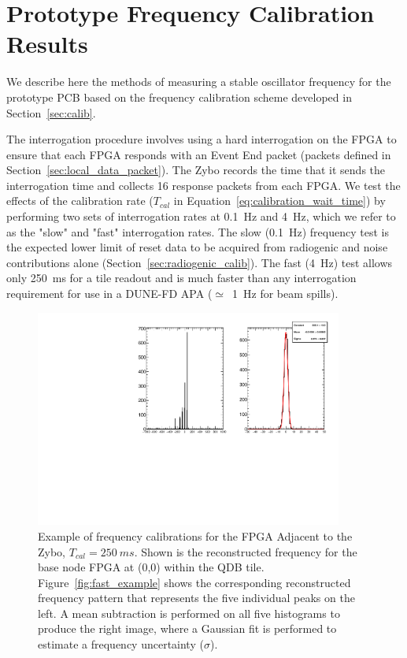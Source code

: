 \section{Prototype Frequency Calibration Results}
\label{sec:freq_calib_results}
We describe here the methods of measuring a stable oscillator frequency for the prototype PCB based on the frequency calibration scheme developed in Section~\ref{sec:calib}.

The interrogation procedure involves using a hard interrogation on the FPGA to ensure that each FPGA responds with an Event End packet (packets defined in Section~\ref{sec:local_data_packet}).
The Zybo records the time that it sends the interrogation time and collects 16 response packets from each FPGA.
We test the effects of the calibration rate ($T_{cal}$ in Equation~\ref{eq:calibration_wait_time}) by performing two sets of interrogation rates at 0.1~\unit{Hz} and 4~\unit{Hz}, which we refer to as the "slow" and "fast" interrogation rates.
The slow (0.1~\unit{Hz}) frequency test is the expected lower limit of reset data to be acquired from radiogenic and noise contributions alone (Section~\ref{sec:radiogenic_calib}).
The fast (4~\unit{Hz}) test allows only 250~\unit{ms} for a tile readout and is much faster than any interrogation requirement for use in a DUNE-FD APA ($\simeq$~1~\unit{Hz} for beam spills). 

\begin{figure}[]
\centering
\includegraphics[width=0.9\textwidth]{images/(0,0).pdf}
\caption{Example of frequency calibrations for the FPGA Adjacent to the Zybo, $T_{cal} = 250~\unit{ms}$.
Shown is the reconstructed frequency for the base node FPGA at (0,0) within the QDB tile.
Figure~\ref{fig:fast_example} shows the corresponding reconstructed frequency pattern that represents the five individual peaks on the left.
A mean subtraction is performed on all five histograms to produce the right image, where a Gaussian fit is performed to estimate a frequency uncertainty ($\sigma$).
}
\label{fig:frq_recon_node00}
\end{figure}

